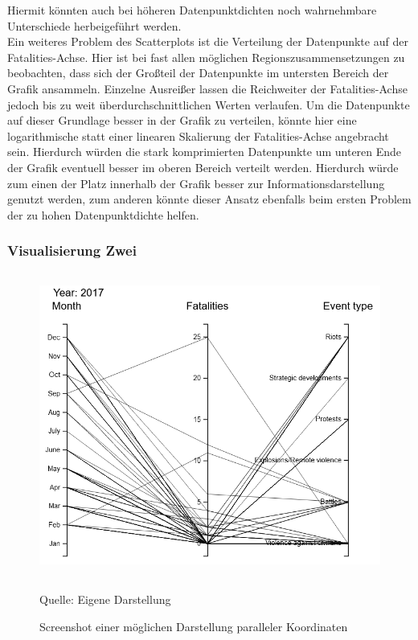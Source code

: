 \documentclass[usegeometry=true]{scrartcl}
\begin{document}
Hiermit könnten auch bei höheren Datenpunktdichten noch wahrnehmbare Unterschiede herbeigeführt werden.\\ Ein weiteres Problem des Scatterplots ist die Verteilung der Datenpunkte auf der Fatalities-Achse. Hier ist bei fast allen möglichen Regionszusammensetzungen zu beobachten, dass sich der Großteil der Datenpunkte im untersten Bereich der Grafik ansammeln. Einzelne Ausreißer lassen die Reichweiter der Fatalities-Achse jedoch bis zu weit überdurchschnittlichen Werten verlaufen. Um die Datenpunkte auf dieser Grundlage besser in der Grafik zu verteilen, könnte hier eine logarithmische statt einer linearen Skalierung der Fatalities-Achse angebracht sein. Hierdurch würden die stark komprimierten Datenpunkte um unteren Ende der Grafik eventuell besser im oberen Bereich verteilt werden. Hierdurch würde zum einen der Platz innerhalb der Grafik besser zur Informationsdarstellung genutzt werden, zum anderen könnte dieser Ansatz ebenfalls beim ersten Problem der zu hohen Datenpunktdichte helfen.\\

\subsubsection{Visualisierung Zwei}

\begin{figure}[]
\begin{center}
\includegraphics[width=12cm,height=10cm,keepaspectratio]{ParalleleKoordinaten.PNG}%
\caption{Screenshot einer möglichen Darstellung paralleler Koordinaten}
Quelle: Eigene Darstellung
\label{parallelCoordinates}
\end{center}
\end{figure}
\end{document}
